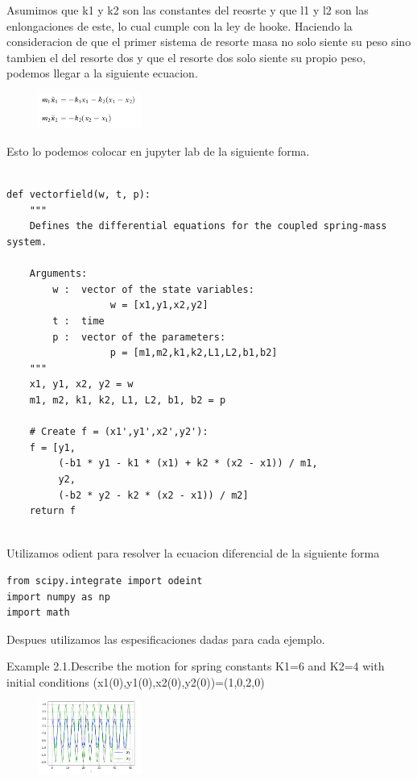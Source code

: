 \documentclass[a4paper]{article}
\begin{document}
Asumimos que k1 y k2 son las constantes del reosrte y que l1 y l2 son las enlongaciones de este, lo cual cumple con la ley de hooke. Haciendo la consideracion de que el primer sistema de resorte masa no solo siente su peso sino tambien el del resorte dos y que el resorte dos solo siente su propio peso, podemos llegar a la siguiente ecuacion.

\begin{figure}[ht!]
\centering
\includegraphics[width=0.3\textwidth]{E1.png}
\end{figure}

Esto lo podemos colocar en jupyter lab de la siguiente forma. 

\begin{verbatim}

def vectorfield(w, t, p):
    """
    Defines the differential equations for the coupled spring-mass system.

    Arguments:
        w :  vector of the state variables:
                  w = [x1,y1,x2,y2]
        t :  time
        p :  vector of the parameters:
                  p = [m1,m2,k1,k2,L1,L2,b1,b2]
    """
    x1, y1, x2, y2 = w
    m1, m2, k1, k2, L1, L2, b1, b2 = p

    # Create f = (x1',y1',x2',y2'):
    f = [y1,
         (-b1 * y1 - k1 * (x1) + k2 * (x2 - x1)) / m1,
         y2,
         (-b2 * y2 - k2 * (x2 - x1)) / m2]
    return f


\end{verbatim}

Utilizamos odient para resolver la ecuacion diferencial de la siguiente forma

\begin{verbatim}
from scipy.integrate import odeint
import numpy as np
import math

\end{verbatim}

Despues utilizamos las espesificaciones dadas para cada ejemplo.

Example 2.1.Describe the motion for spring constants K1=6 and K2=4 with initial conditions (x1(0),y1(0),x2(0),y2(0))=(1,0,2,0)  

\begin{figure}[ht!]
\centering
\includegraphics[width=0.3\textwidth]{2_1_1.png}
\end{figure}
\end{document}
